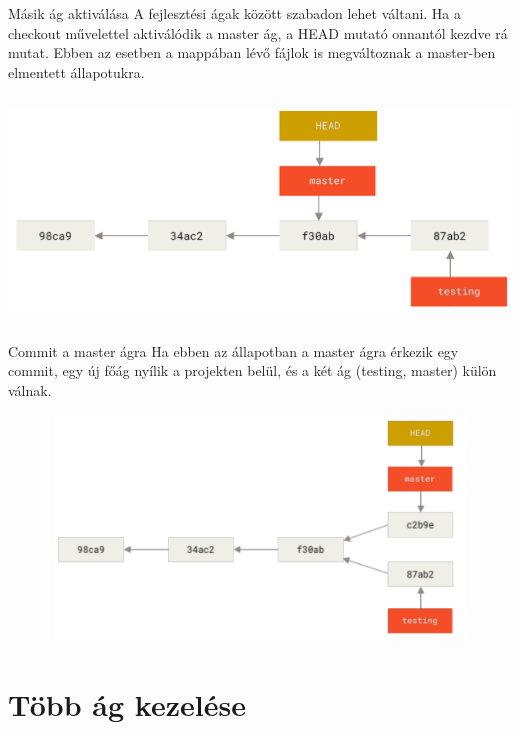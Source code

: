 \documentclass[english, aspectratio=169]{beamer}
\makeatletter
\let\origtableofcontents=\tableofcontents
\def\tableofcontents{\@ifnextchar[{\origtableofcontents}{\gobbletableofcontents}}
\def\gobbletableofcontents#1{\origtableofcontents}
\makeatother
\begin{document}
\begin{frame}{Másik ág aktiválása}
A fejlesztési ágak között szabadon lehet váltani. Ha a checkout művelettel aktiválódik a master ág, a HEAD mutató onnantól kezdve rá mutat. Ebben az esetben a mappában lévő fájlok is megváltoznak a master-ben elmentett állapotukra.
\begin{center}
\includegraphics[height=6cm, width=14cm, keepaspectratio]{images/git_10.png}
\end{center}
\end{frame}

\begin{frame}{Commit a master ágra}
Ha ebben az állapotban a master ágra érkezik egy commit, egy új főág nyílik a projekten belül, és a két ág (testing, master) külön válnak.
\begin{center}
\includegraphics[height=6cm, width=14cm, keepaspectratio]{images/git_11.png}
\end{center}
\end{frame}

\section{Több ág kezelése}

\begin{frame}
	\tableofcontents[currentsection]
\end{frame}
\end{document}
